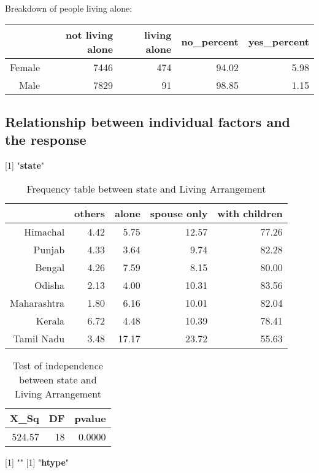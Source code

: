 \documentclass[11pt]{article}
\begin{document}
Breakdown of people living alone:
\begin{table}[H]
\centering
\begin{tabular}{rrrrr}
  \hline
 & not living alone & living alone & no\_percent & yes\_percent \\ 
  \hline
Female & 7446 & 474 & 94.02 & 5.98 \\ 
  Male & 7829 & 91 & 98.85 & 1.15 \\ 
   \hline
\end{tabular}
\end{table}\subsection*{Relationship between individual factors and the response}
[1] "{\bf{state}}"
\begin{table}[H]
\centering
\begin{tabular}{rrrrr}
  \hline
 & others & alone & spouse only & with children \\ 
  \hline
Himachal & 4.42 & 5.75 & 12.57 & 77.26 \\ 
  Punjab & 4.33 & 3.64 & 9.74 & 82.28 \\ 
  Bengal & 4.26 & 7.59 & 8.15 & 80.00 \\ 
  Odisha & 2.13 & 4.00 & 10.31 & 83.56 \\ 
  Maharashtra & 1.80 & 6.16 & 10.01 & 82.04 \\ 
  Kerala & 6.72 & 4.48 & 10.39 & 78.41 \\ 
  Tamil Nadu & 3.48 & 17.17 & 23.72 & 55.63 \\ 
   \hline
\end{tabular}
\caption{Frequency table between state and Living Arrangement} 
\end{table}
\begin{table}[H]
\centering
\begin{tabular}{rrr}
  \hline
X\_Sq & DF & pvalue \\ 
  \hline
524.57 & 18 & 0.0000 \\ 
   \hline
\end{tabular}
\caption{Test of independence between state and Living Arrangement} 
\end{table}
[1] "\newline"
[1] "{\bf{htype}}"
\end{document}
